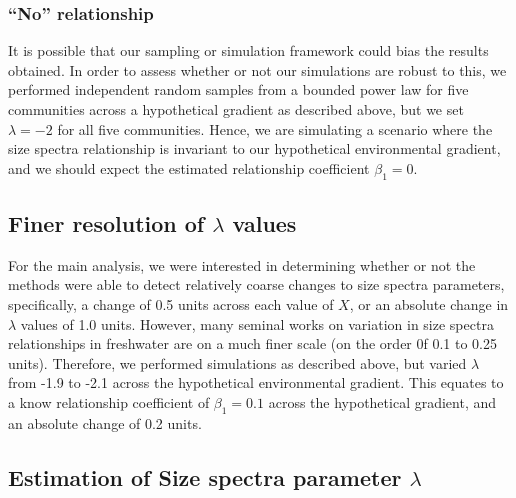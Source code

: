 \documentclass[
]{article}
\begin{document}
\hypertarget{no-relationship}{%
\subsubsection{``No'' relationship}\label{no-relationship}}

It is possible that our sampling or simulation framework could bias the
results obtained. In order to assess whether or not our simulations are
robust to this, we performed independent random samples from a bounded
power law for five communities across a hypothetical gradient as
described above, but we set \(\lambda = -2\) for all five communities.
Hence, we are simulating a scenario where the size spectra relationship
is invariant to our hypothetical environmental gradient, and we should
expect the estimated relationship coefficient \(\beta_1 = 0\).

\hypertarget{finer-resolution-of-lambda-values}{%
\subsection{\texorpdfstring{Finer resolution of \(\lambda\)
values}{Finer resolution of \textbackslash lambda values}}\label{finer-resolution-of-lambda-values}}

For the main analysis, we were interested in determining whether or not
the methods were able to detect relatively coarse changes to size
spectra parameters, specifically, a change of 0.5 units across each
value of \(X\), or an absolute change in \(\lambda\) values of 1.0
units. However, many seminal works on variation in size spectra
relationships in freshwater are on a much finer scale (on the order 0f
0.1 to 0.25 units). Therefore, we performed simulations as described
above, but varied \(\lambda\) from -1.9 to -2.1 across the hypothetical
environmental gradient. This equates to a know relationship coefficient
of \(\beta_1 = 0.1\) across the hypothetical gradient, and an absolute
change of 0.2 units.

\hypertarget{estimation-of-size-spectra-parameter-lambda}{%
\subsection{\texorpdfstring{Estimation of Size spectra parameter
\(\lambda\)}{Estimation of Size spectra parameter \textbackslash lambda}}\label{estimation-of-size-spectra-parameter-lambda}}
\end{document}

